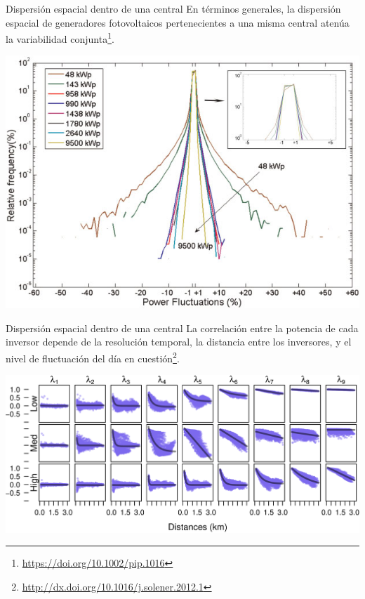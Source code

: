 \documentclass[aspectratio=169, usenames,svgnames,dvipsnames]{beamer}
\begin{document}
\begin{frame}[label={sec:org5a77ca7}]{Dispersión espacial dentro de una central}
En términos generales, la \alert{dispersión espacial} de generadores
fotovoltaicos pertenecientes a \alert{una misma central} \alert{atenúa} la
variabilidad conjunta\footnote{\url{https://doi.org/10.1002/pip.1016}}.

\begin{center}
\includegraphics[height=0.7\textheight]{../figs/Variabilidad_DispersionGeografica_Planta.png}
\end{center}
\end{frame}

\begin{frame}[label={sec:org2ed7bba}]{Dispersión espacial dentro de una central}
La correlación entre la potencia de cada inversor \alert{depende} de la \alert{resolución temporal}, la \alert{distancia} entre los inversores, y el \alert{nivel de fluctuación del día} en cuestión\footnote{\url{http://dx.doi.org/10.1016/j.solener.2012.1}}.

\begin{center}
\includegraphics[height=0.6\textheight]{../figs/corDistMatrix_nls.png}
\end{center}
\end{frame}
\end{document}
